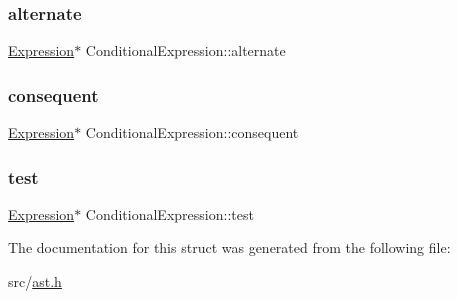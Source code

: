 \subsubsection{\texorpdfstring{alternate}{alternate}}
{\footnotesize\ttfamily \hyperlink{struct_expression}{Expression}$\ast$ Conditional\+Expression\+::alternate}

\mbox{\label{struct_conditional_expression_ac129a280df90c129183ec955f4e50ed0}} 
\subsubsection{\texorpdfstring{consequent}{consequent}}
{\footnotesize\ttfamily \hyperlink{struct_expression}{Expression}$\ast$ Conditional\+Expression\+::consequent}

\mbox{\label{struct_conditional_expression_a7bfe134769078a10eecccabba7405cc2}} 
\subsubsection{\texorpdfstring{test}{test}}
{\footnotesize\ttfamily \hyperlink{struct_expression}{Expression}$\ast$ Conditional\+Expression\+::test}



The documentation for this struct was generated from the following file\+:\begin{DoxyCompactItemize}
\item 
src/\hyperlink{ast_8h}{ast.\+h}\end{DoxyCompactItemize}

